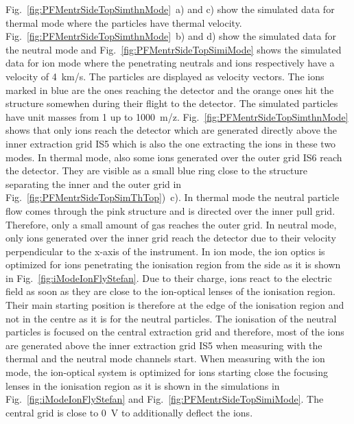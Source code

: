 	Fig.~\ref{fig:PFMentrSideTopSimthnMode}~a) and c) show the simulated data for thermal mode where the particles have thermal velocity. Fig.~\ref{fig:PFMentrSideTopSimthnMode}~b) and d) show the simulated data for the neutral mode and Fig.~\ref{fig:PFMentrSideTopSimiMode} shows the simulated data for ion mode where the penetrating neutrals and ions respectively have a velocity of 4~km/s.	The particles are displayed as velocity vectors. The ions marked in blue are the ones reaching the detector and the orange ones hit the structure somewhen during their flight to the detector. The simulated particles have unit masses from 1 up to 1000~m/z.	Fig.~\ref{fig:PFMentrSideTopSimthnMode} shows that only ions reach the detector which are generated directly above the inner extraction grid IS5 which is also the one extracting the ions in these two modes. In thermal mode, also some ions generated over the outer grid IS6 reach the detector. They are visible as a small blue ring close to the structure separating the inner and the outer grid in Fig.~\ref{fig:PFMentrSideTopSimThTop})~c). In thermal mode the neutral particle flow comes through the pink structure and is directed over the inner pull grid. Therefore, only a small amount of gas reaches the outer grid. In neutral mode, only ions generated over the inner grid reach the detector due to their velocity perpendicular to the x-axis of the instrument. In ion mode, the ion optics is optimized for ions penetrating the ionisation region from the side as it is shown in Fig.~\ref{fig:iModeIonFlyStefan}. Due to their charge, ions react to the electric field as soon as they are close to the ion-optical lenses of the ionisation region. Their main starting position is therefore at the edge of the ionisation region and not in the centre as it is for the neutral particles. The ionisation of the neutral particles is focused on the central extraction grid and therefore, most of the ions are generated above the inner extraction grid IS5 when measuring with the thermal and the neutral mode channels start. When measuring with the ion mode, the ion-optical system is optimized for ions starting close the focusing lenses in the ionisation region as it is shown in the simulations in Fig.~\ref{fig:iModeIonFlyStefan} and Fig.~\ref{fig:PFMentrSideTopSimiMode}. The central grid is close to 0~V to additionally deflect the ions.\\
